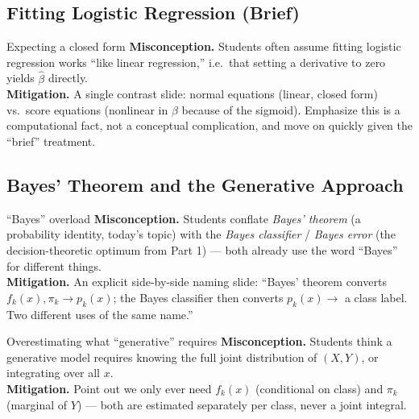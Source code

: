 \documentclass[11pt]{article}
\begin{document}
\subsection{Fitting Logistic Regression (Brief)}
\begin{diffconcept}{Expecting a closed form}
\textbf{Misconception.} Students often assume fitting logistic regression works ``like linear regression,'' i.e.\ that setting a derivative to zero yields $\hat\beta$ directly. \\
\textbf{Mitigation.} A single contrast slide: normal equations (linear, closed form) vs.\ score equations (nonlinear in $\beta$ because of the sigmoid). Emphasize this is a computational fact, not a conceptual complication, and move on quickly given the ``brief'' treatment.
\end{diffconcept}

\subsection{Bayes' Theorem and the Generative Approach}
\begin{diffconcept}{``Bayes'' overload}
\textbf{Misconception.} Students conflate \emph{Bayes' theorem} (a probability identity, today's topic) with the \emph{Bayes classifier} / \emph{Bayes error} (the decision-theoretic optimum from Part 1) --- both already use the word ``Bayes'' for different things. \\
\textbf{Mitigation.} An explicit side-by-side naming slide: ``Bayes' theorem converts $f_k(x),\pi_k \to p_k(x)$; the Bayes classifier then converts $p_k(x) \to$ a class label. Two different uses of the same name.''
\end{diffconcept}
\begin{diffconcept}{Overestimating what ``generative'' requires}
\textbf{Misconception.} Students think a generative model requires knowing the full joint distribution of $(X,Y)$, or integrating over all $x$. \\
\textbf{Mitigation.} Point out we only ever need $f_k(x)$ (conditional on class) and $\pi_k$ (marginal of $Y$) --- both are estimated separately per class, never a joint integral.
\end{diffconcept}
\end{document}
